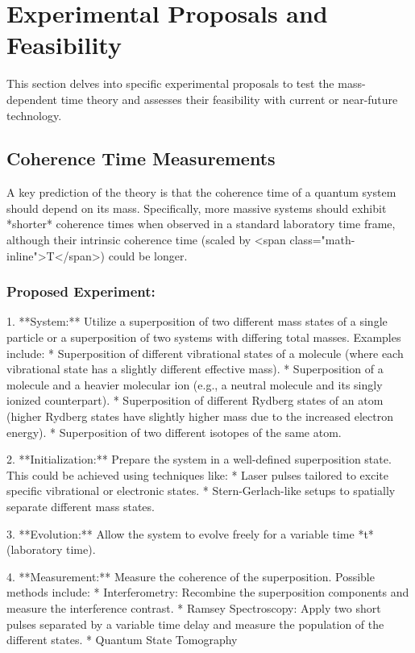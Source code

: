 \documentclass{article}
\begin{document}
\section{Experimental Proposals and Feasibility}

This section delves into specific experimental proposals to test the mass-dependent time theory and assesses their feasibility with current or near-future technology.

\subsection{Coherence Time Measurements}

\label{subsec:coherence_exp}

A key prediction of the theory is that the coherence time of a quantum system should depend on its mass.  Specifically, more massive systems should exhibit *shorter* coherence times when observed in a standard laboratory time frame, although their intrinsic coherence time (scaled by <span class="math-inline">T</span>) could be longer.

\subsubsection{Proposed Experiment:}

1.  **System:** Utilize a superposition of two different mass states of a single particle or a superposition of two systems with differing total masses.  Examples include:
*   Superposition of different vibrational states of a molecule (where each vibrational state has a slightly different effective mass).
*   Superposition of a molecule and a heavier molecular ion (e.g., a neutral molecule and its singly ionized counterpart).
*   Superposition of different Rydberg states of an atom (higher Rydberg states have slightly higher mass due to the increased electron energy).
* Superposition of two different isotopes of the same atom.

2.  **Initialization:** Prepare the system in a well-defined superposition state.  This could be achieved using techniques like:
*   Laser pulses tailored to excite specific vibrational or electronic states.
*   Stern-Gerlach-like setups to spatially separate different mass states.

3.  **Evolution:** Allow the system to evolve freely for a variable time *t* (laboratory time).

4.  **Measurement:** Measure the coherence of the superposition.  Possible methods include:
*   Interferometry: Recombine the superposition components and measure the interference contrast.
*   Ramsey Spectroscopy: Apply two short pulses separated by a variable time delay and measure the population of the different states.
* Quantum State Tomography
\end{document}
